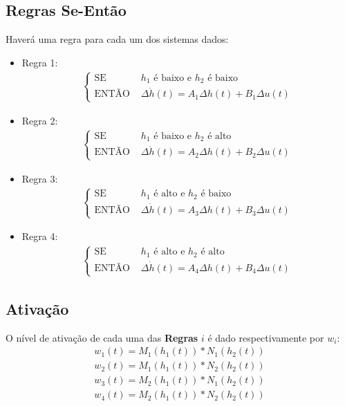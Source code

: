 \subsection{Regras Se-Então}
Haverá uma regra para cada um dos sistemas dados:

	\begin{itemize}
		\item Regra 1:\\ 
		\begin{align*}
			\begin{cases}
				\text{SE } &h_1 \text{ é baixo e } h_2 \text{ é baixo} \\
				\text{ENTÃO } &\Delta \dot{h}(t) =  A_1 \Delta h(t) +  B_1 \Delta u(t)
			\end{cases}		
		\end{align*}

		\item Regra 2:\\ 
		\begin{align*}
		\begin{cases}
			\text{SE } &h_1 \text{ é baixo e } h_2 \text{ é alto} \\
			\text{ENTÃO } &\Delta \dot{h}(t) =  A_2 \Delta h(t) +  B_2 \Delta u(t)
		\end{cases}		
		\end{align*}

		\item Regra 3:\\ 
		\begin{align*}
		\begin{cases}
			\text{SE } &h_1 \text{ é alto e } h_2 \text{ é baixo} \\
			\text{ENTÃO } &\Delta \dot{h}(t) =  A_3 \Delta h(t) +  B_3 \Delta u(t)
		\end{cases}		
		\end{align*}

		\item Regra 4:\\ 
		\begin{align*}
		\begin{cases}
			\text{SE } &h_1 \text{ é alto e } h_2 \text{ é alto} \\
			\text{ENTÃO } &\Delta \dot{h}(t) =  A_4 \Delta h(t) +  B_4 \Delta u(t)
		\end{cases}		
		\end{align*}
	\end{itemize}

\subsection{Ativação}
O nível de ativação de cada uma das \textbf{Regras} $i$ é dado respectivamente por $w_i$:
	\begin{equation}
	\begin{aligned}
		w_{1}(t) = M_1(h_1(t)) * N_1(h_2(t)) \\
		w_{2}(t) = M_1(h_1(t)) * N_2(h_2(t)) \\
		w_{3}(t) = M_2(h_1(t)) * N_1(h_2(t)) \\
		w_{4}(t) = M_2(h_1(t)) * N_2(h_2(t))
	\end{aligned}
	\label{eqGrauAtiv4T}
	\end{equation}
	
